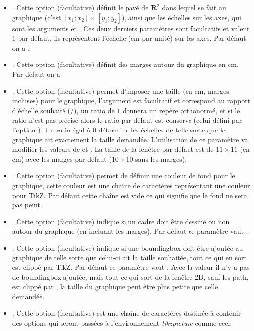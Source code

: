 \begin{itemize}
 \item {}. Cette option (facultative) définit le pavé de $\mathbf R^2$ dans lequel se fait au graphique (c'est $[x_1;x_2]\times[y_1;y_2]$), ainsi que les échelles sur les axes, qui sont les arguments  et . Ces deux derniers paramètres sont facultatifs et valent $1$ par défaut, ils représentent l'échelle (cm par unité) sur les axes. Par défaut on a .
 
\item {}. Cette option (facultative) définit des marges autour du graphique en cm. Par défaut on a .

\item {}. Cette option (facultative) permet d'imposer une taille (en cm, marges incluses) pour le graphique, l'argument  est facultatif et correspond au rapport d'échelle souhaité (/), un ratio de $1$ donnera un repère orthonormé, et si le ratio n'est pas précisé alors le ratio par défaut est conservé (celui défini par l'option ). Un ratio égal à $0$ détermine les échelles de telle sorte que le graphique ait exactement la taille demandée. L'utilisation de ce paramètre va modifier les valeurs de  et . La taille de la fenêtre par défaut est de $11\times11$ (en cm) avec les marges par défaut ($10\times10$ sans les marges).

\item {}. Cette option (facultative) permet de définir une couleur de fond pour le graphique, cette couleur est une chaîne de caractères représentant une couleur pour TikZ. Par défaut cette chaîne est vide ce qui signifie que le fond ne sera pas peint.

\item {}. Cette option (facultative) indique si un cadre doit être dessiné ou non autour du graphique (en incluant les marges). Par défaut ce paramètre vaut \false.

\item {}. Cette option (facultative) indique si une boundingbox doit être ajoutée au graphique de telle sorte que celui-ci ait la taille souhaitée, tout ce qui en sort est clippé par TikZ. Par défaut ce paramètre vaut \true. Avec la valeur \false il n'y a pas de boundingbox ajoutée, mais tout ce qui sort de la fenêtre 2D, sauf les path, est clippé par \luadrawenv, la taille du graphique peut être plus petite que celle demandée.

\item {}. Cette option (facultative) est une chaîne de caractères destinée à contenir des options qui seront passées à l'environnement \emph{tikzpicture} comme ceci:
\begin{TeXcode}
\begin{tikzpicture}[line join=round <,pictureoptions>]
\end{TeXcode}
\end{itemize}


